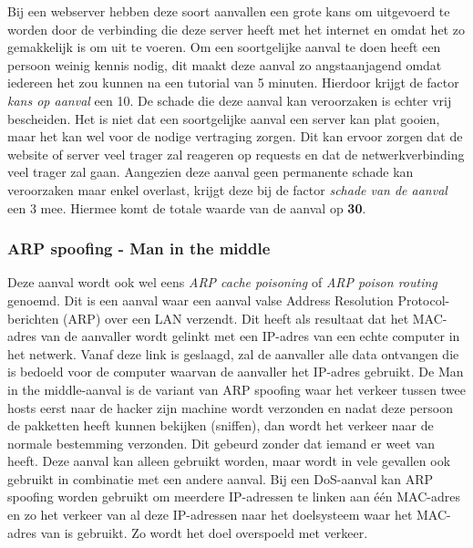 \documentclass[pdftex,a4paper,12pt]{report}
\begin{document}
Bij een webserver hebben deze soort aanvallen een grote kans om uitgevoerd te worden door de verbinding die deze server heeft met het internet en omdat het zo gemakkelijk is om uit te voeren. Om een soortgelijke aanval te doen heeft een persoon weinig kennis nodig, dit maakt deze aanval zo angstaanjagend omdat iedereen het zou kunnen na een tutorial van 5 minuten. Hierdoor krijgt de factor \textit{kans op aanval} een 10. De schade die deze aanval kan veroorzaken is echter vrij bescheiden. Het is niet dat een soortgelijke aanval een server kan plat gooien, maar het kan wel voor de nodige vertraging zorgen. Dit kan ervoor zorgen dat de website of server veel trager zal reageren op requests en dat de netwerkverbinding veel trager zal gaan. Aangezien deze aanval geen permanente schade kan veroorzaken maar enkel overlast, krijgt deze bij de factor \textit{schade van de aanval} een 3 mee. Hiermee komt de totale waarde van de aanval op \textbf{30}.

\subsubsection{ARP spoofing - Man in the middle}
Deze aanval wordt ook wel eens \textit{ARP cache poisoning} of \textit{ARP poison routing} genoemd. Dit is een aanval waar een aanval valse Address Resolution Protocol-berichten (ARP) over een LAN verzendt. Dit heeft als resultaat dat het MAC-adres van de aanvaller wordt gelinkt met een IP-adres van een echte computer in het netwerk. Vanaf deze link is geslaagd, zal de aanvaller alle data ontvangen die is bedoeld voor de computer waarvan de aanvaller het IP-adres gebruikt. De Man in the middle-aanval is de variant van ARP spoofing waar het verkeer tussen twee hosts eerst naar de hacker zijn machine wordt verzonden en nadat deze persoon de pakketten heeft kunnen bekijken (sniffen), dan wordt het verkeer naar de normale bestemming verzonden. Dit gebeurd zonder dat iemand er weet van heeft. Deze aanval kan alleen gebruikt worden, maar wordt in vele gevallen ook gebruikt in combinatie met een andere aanval. Bij een DoS-aanval kan ARP spoofing worden gebruikt om meerdere IP-adressen te linken aan één MAC-adres en zo het verkeer van al deze IP-adressen naar het doelsysteem waar het MAC-adres van is gebruikt. Zo wordt het doel overspoeld met verkeer. \citep{Glynn2014} \newline
\end{document}
